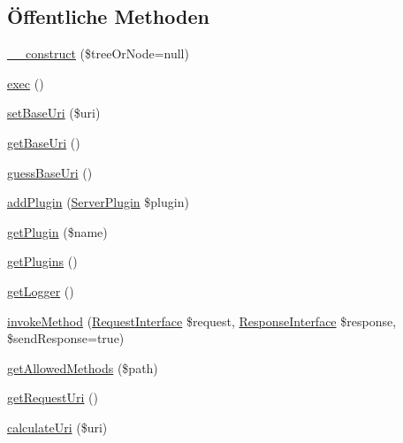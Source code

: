 \subsection*{Öffentliche Methoden}
\begin{DoxyCompactItemize}
\item 
\mbox{\hyperlink{class_sabre_1_1_d_a_v_1_1_server_aaff51826e67e363422c83ae0e379a2a0}{\+\_\+\+\_\+construct}} (\$tree\+Or\+Node=null)
\item 
\mbox{\hyperlink{class_sabre_1_1_d_a_v_1_1_server_a4f906560ecbe3c0fd497d62055ca891f}{exec}} ()
\item 
\mbox{\hyperlink{class_sabre_1_1_d_a_v_1_1_server_a98318f3b276201964ff99b5fbed09be3}{set\+Base\+Uri}} (\$uri)
\item 
\mbox{\hyperlink{class_sabre_1_1_d_a_v_1_1_server_a32da156111d35451ddf4e7cc08f4dc81}{get\+Base\+Uri}} ()
\item 
\mbox{\hyperlink{class_sabre_1_1_d_a_v_1_1_server_a62cd0c7c754e18281146dfd025d1e5be}{guess\+Base\+Uri}} ()
\item 
\mbox{\hyperlink{class_sabre_1_1_d_a_v_1_1_server_ae03f81b98c33c95202ec57a6f499ebf4}{add\+Plugin}} (\mbox{\hyperlink{class_sabre_1_1_d_a_v_1_1_server_plugin}{Server\+Plugin}} \$plugin)
\item 
\mbox{\hyperlink{class_sabre_1_1_d_a_v_1_1_server_a031cd7834c452c3cd172b13f4b15f09f}{get\+Plugin}} (\$name)
\item 
\mbox{\hyperlink{class_sabre_1_1_d_a_v_1_1_server_a0c55cbad92d7945dbe8ebed13cce6755}{get\+Plugins}} ()
\item 
\mbox{\hyperlink{class_sabre_1_1_d_a_v_1_1_server_af65d4d29148e73df8520816c071e18f6}{get\+Logger}} ()
\item 
\mbox{\hyperlink{class_sabre_1_1_d_a_v_1_1_server_a60e6cc7805963b0aca737984f7af2753}{invoke\+Method}} (\mbox{\hyperlink{interface_sabre_1_1_h_t_t_p_1_1_request_interface}{Request\+Interface}} \$request, \mbox{\hyperlink{interface_sabre_1_1_h_t_t_p_1_1_response_interface}{Response\+Interface}} \$response, \$send\+Response=true)
\item 
\mbox{\hyperlink{class_sabre_1_1_d_a_v_1_1_server_aae2250fb9dc3cdaa5206687636b7e30b}{get\+Allowed\+Methods}} (\$path)
\item 
\mbox{\hyperlink{class_sabre_1_1_d_a_v_1_1_server_a58f56fb7884519343468d668fee5b35e}{get\+Request\+Uri}} ()
\item 
\mbox{\hyperlink{class_sabre_1_1_d_a_v_1_1_server_a68bbf1aa1442364def7bb26f01a9318f}{calculate\+Uri}} (\$uri)
\item 

\end{DoxyCompactItemize}
